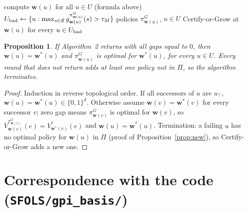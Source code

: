 \documentclass[11pt]{article}
\newcommand{\w}{\mathbf{w}}
\newcommand{\cS}{\mathcal S}
\newtheorem{proposition}{Proposition}
\theoremstyle{definition}
\begin{document}
\begin{algorithm}[H]
\caption{Certified SF-FSA-VI ($\Pi$, $\mathcal B$ shared across tasks)}
\begin{algorithmic}[1]
\Loop
  \State compute $\w(u)$ for all $u\in U$ (formula above)
  \State $U_{\rm bad}\gets\{u:\max_{s\in\cS}g^{\pi^G_{\w(u)}}_{\w(u)}(s)>\tau_M\}$
   \Return policies $\pi^G_{\w(u)}$, $u\in U$ \EndIf
  \State Certify-or-Grow at $\w(u)$ for every $u\in U_{\rm bad}$
\EndLoop
\end{algorithmic}
\end{algorithm}

\begin{proposition}\label{prop:task}
If Algorithm~2 returns with all gaps equal to $0$, then $\w(u)=\w^*(u)$ and $\pi^G_{\w(u)}$ is optimal for
$\w^*(u)$, for every $u\in U$. Every round that does not return adds at least one policy not in $\Pi$, so the
algorithm terminates.
\end{proposition}
\begin{proof}
Induction in reverse topological order. If all successors of $u$ are $u_\top$, $\w(u)=\w^*(u)\in\{0,1\}^d$.
Otherwise assume $\w(v)=\w^*(v)$ for every successor $v$; zero gap means $\pi^G_{\w(v)}$ is optimal for $\w(v)$,
so $V^{\pi^G_{\w(v)}}_{\w(v)}(e)=V^*_{\w^*(v)}(e)$ and $\w(u)=\w^*(u)$. Termination: a failing $u$ has no
optimal policy for $\w(u)$ in $\Pi$ (proof of Proposition~\ref{prop:new}), so Certify-or-Grow adds a new one.
\end{proof}

\section{Correspondence with the code (\texttt{SFOLS/gpi\_basis/})}\label{sec:code}
\end{document}
